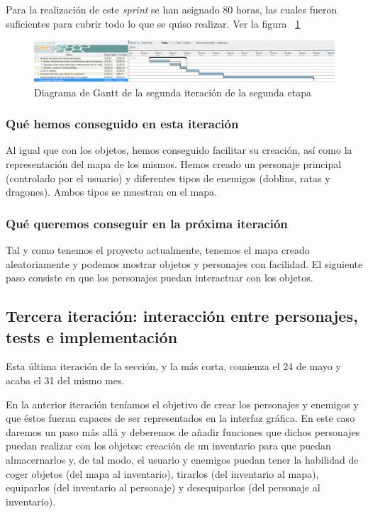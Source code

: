 Para la realización de este \textit{sprint} se han asignado 80 horas, las cuales fueron suficientes para cubrir todo lo que se quiso realizar. Ver la figura ~\ref{fig:sec2it2}

\begin{figure}
    \includegraphics[width=\textwidth,height=\textheight,keepaspectratio]{./img/sec2it2.png}
  \caption{Diagrama de Gantt de la segunda iteración de la segunda etapa}
  \label{fig:sec2it2}
\end{figure}

\subsubsection{Qué hemos conseguido en esta iteración}

Al igual que con los objetos, hemos conseguido facilitar su creación, así como la representación del mapa de los mismos. Hemos creado un personaje principal (controlado por el usuario) y diferentes tipos de enemigos (doblins, ratas y dragones). Ambos tipos se muestran en el mapa.

\subsubsection{Qué queremos conseguir en la próxima iteración}

Tal y como tenemos el proyecto actualmente, tenemos el mapa creado aleatoriamente y podemos mostrar objetos y personajes con facilidad. El siguiente paso consiste en que los personajes puedan interactuar con los objetos.

\subsection{Tercera iteración: interacción entre personajes, tests e implementación}

Esta última iteración de la sección, y la más corta, comienza el 24 de mayo y acaba el 31 del mismo mes.

En la anterior iteración teníamos el objetivo de crear los personajes y enemigos y que éstos fueran capaces de ser representados en la interfaz gráfica. En este caso daremos un paso más allá y deberemos de añadir funciones que dichos personajes puedan realizar con los objetos: creación de un inventario para que puedan almacernarlos y, de tal modo, el usuario y enemigos puedan tener la habilidad de coger objetos (del mapa al inventario), tirarlos (del inventario al mapa), equiparlos (del inventario al personaje) y desequiparlos (del personaje al inventario).


